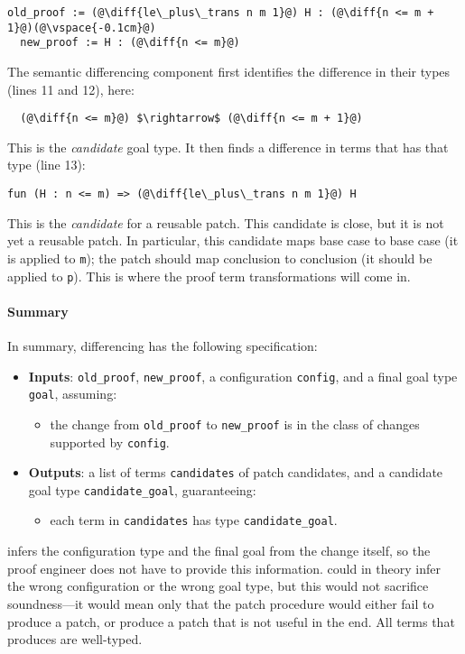 \begin{lstlisting}[language=coq]
  old_proof := (@\diff{le\_plus\_trans n m 1}@) H : (@\diff{n <= m + 1}@)(@\vspace{-0.1cm}@)
  new_proof := H : (@\diff{n <= m}@)
\end{lstlisting}
The semantic differencing component first identifies the difference in their types (lines 11 and 12), here:

\begin{lstlisting}
  (@\diff{n <= m}@) $\rightarrow$ (@\diff{n <= m + 1}@)
\end{lstlisting}
This is the \textit{candidate} goal type.
It then finds a difference in terms that has that type (line 13):

\begin{lstlisting}[language=coq]
  fun (H : n <= m) => (@\diff{le\_plus\_trans n m 1}@) H
\end{lstlisting}
This is the \emph{candidate} for a reusable patch.
This candidate is close, but it is not yet a reusable patch. In particular, this candidate
maps base case to base case (it is applied to \lstinline{m}); the patch should map conclusion to conclusion (it should
be applied to \lstinline{p}).
This is where the proof term transformations will come in.

\paragraph{Summary}
In summary, differencing has the following specification:

\begin{itemize}
\item \textbf{Inputs}: \lstinline{old_proof}, \lstinline{new_proof}, a configuration \lstinline{config}, and a final goal type \lstinline{goal}, assuming:
\begin{itemize}
\item the change from \lstinline{old_proof} to \lstinline{new_proof} is in the class of changes supported by \lstinline{config}.
\end{itemize}
\item \textbf{Outputs}: a list of terms \lstinline{candidates} of patch candidates, and a candidate goal type \lstinline{candidate_goal}, guaranteeing:
\begin{itemize}
\item each term in \lstinline{candidates} has type \lstinline{candidate_goal}.
\end{itemize}
\end{itemize}
\sysname infers the configuration type and the final goal from the change itself, so the proof engineer does not have to provide this information.
\sysname could in theory infer the wrong configuration or the wrong goal type, but this would not sacrifice soundness---it would mean only that
the patch procedure would either fail to produce a patch, or produce a patch that is not useful in the end.
All terms that \sysname produces are well-typed. %

